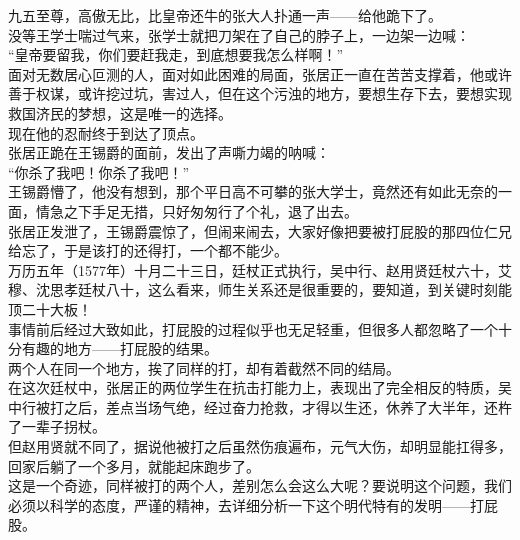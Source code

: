 \begin{multicols}{\theparacolNo}
九五至尊，高傲无比，比皇帝还牛的张大人扑通一声——给他跪下了。\\

没等王学士喘过气来，张学士就把刀架在了自己的脖子上，一边架一边喊：\\

“皇帝要留我，你们要赶我走，到底想要我怎么样啊！”\\

面对无数居心叵测的人，面对如此困难的局面，张居正一直在苦苦支撑着，他或许善于权谋，或许挖过坑，害过人，但在这个污浊的地方，要想生存下去，要想实现救国济民的梦想，这是唯一的选择。\\

现在他的忍耐终于到达了顶点。\\

张居正跪在王锡爵的面前，发出了声嘶力竭的呐喊：\\

“你杀了我吧！你杀了我吧！”\\

王锡爵懵了，他没有想到，那个平日高不可攀的张大学士，竟然还有如此无奈的一面，情急之下手足无措，只好匆匆行了个礼，退了出去。\\

张居正发泄了，王锡爵震惊了，但闹来闹去，大家好像把要被打屁股的那四位仁兄给忘了，于是该打的还得打，一个都不能少。\\

万历五年（1577年）十月二十三日，廷杖正式执行，吴中行、赵用贤廷杖六十，艾穆、沈思孝廷杖八十，这么看来，师生关系还是很重要的，要知道，到关键时刻能顶二十大板！\\

事情前后经过大致如此，打屁股的过程似乎也无足轻重，但很多人都忽略了一个十分有趣的地方——打屁股的结果。\\

两个人在同一个地方，挨了同样的打，却有着截然不同的结局。\\

在这次廷杖中，张居正的两位学生在抗击打能力上，表现出了完全相反的特质，吴中行被打之后，差点当场气绝，经过奋力抢救，才得以生还，休养了大半年，还杵了一辈子拐杖。\\

但赵用贤就不同了，据说他被打之后虽然伤痕遍布，元气大伤，却明显能扛得多，回家后躺了一个多月，就能起床跑步了。\\

这是一个奇迹，同样被打的两个人，差别怎么会这么大呢？要说明这个问题，我们必须以科学的态度，严谨的精神，去详细分析一下这个明代特有的发明——打屁股。\\


\end{multicols}
